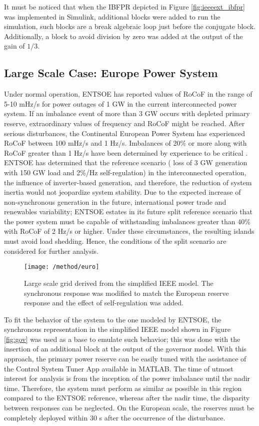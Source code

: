 It must be noticed that when the IBFPR depicted in Figure \ref{fig:ieeeext_ibfpr} was implemented in Simulink, additional blocks were added to run the simulation, such blocks are a break algebraic loop just before the conjugate block. Additionally, a block to avoid division by zero was added at the output of the gain of $ 1 /3 $.

\subsection{Large Scale Case: Europe Power System}

Under normal operation, ENTSOE has reported values of RoCoF in the range of 5-10 mHz/s for power outages of 1 GW in the current interconnected power system. If an imbalance event of more than 3 GW occurs with depleted primary reserve, extraordinary values of frequency and RoCoF might be reached. After serious disturbances, the Continental European Power System has experienced RoCoF between 100 mHz/s and 1 Hz/s. Imbalances of 20\% or more along with RoCoF greater than 1 Hz/s have been determined by experience to be critical \cite{ENTSOE.2016}. ENTSOE has determined that the reference scenario ( loss of 3 GW generation with 150 GW load and 2\%/Hz self-regulation) in the interconnected operation, the influence of inverter-based generation, and therefore, the reduction of system inertia would not jeopardize system stability. Due to the expected increase of non-synchronous generation in the future, international power trade and renewables variability; ENTSOE estates in its future split reference scenario that the power system must be capable of withstanding imbalances greater than 40\% with RoCoF of 2 Hz/s or higher. Under these circumstances, the resulting islands must avoid load shedding. Hence, the conditions of the split scenario are considered for further analysis.
\begin{figure}[h]
	\centering
	\texttt{[image: /method/euro]}
	\caption{Large scale grid derived from the simplified IEEE model. The synchronous response was modified to match the European reserve response and the effect of self-regulation was added.}
	\label{fig:euro}
\end{figure}

To fit the behavior of the system to the one modeled by ENTSOE, the synchronous representation in the simplified IEEE model shown in Figure \ref{fig:gov} was used as a base to emulate such behavior; this was done with the insertion of an additional block at the output of the governor model. With this approach, the primary power reserve can be easily tuned with the assistance of the Control System Tuner App available in MATLAB. The time of utmost interest for analysis is from the inception of the power imbalance until the nadir time. Therefore, the system must perform as similar as possible in this region compared to the ENTSOE reference, whereas after the nadir time, the disparity between responses can be neglected. On the European scale, the reserves must be completely deployed within 30 s after the occurrence of the disturbance.

